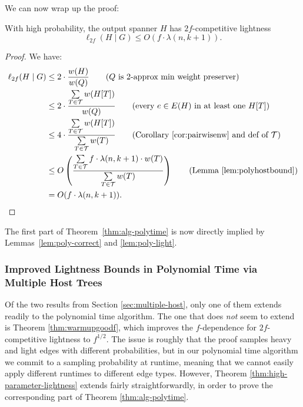 We can now wrap up the proof:
\begin{lemma} \label{lem:poly-light}
With high probability, the output spanner $H$ has $2f$-competitive lightness
$$\ell_{2f}(H \mid G) \le O\left( f \cdot \lambda(n, k+1) \right).$$
\end{lemma}
\begin{proof}
We have:
\begin{align*}
\ell_{2f}(H \mid G) &\le 2 \cdot \frac{w(H)}{w(Q)} \tag{$Q$ is $2$-approx min weight preserver}\\
&\leq 2 \cdot \frac{\sum \limits_{T \in \tee} w(H[T])}{w(Q)} \tag{every $e \in E(H)$ in at least one $H[T]$} \\ 
&\leq 4 \cdot \frac{\sum \limits_{T \in \tee} w(H[T])}{\sum \limits_{T \in \tee} w(T)} \tag{Corollary~\ref{cor:pairwisenw} and def of $\tee$}\\
&\le  O\left( \frac{\sum \limits_{T \in \tee} f \cdot \lambda(n, k+1) \cdot w(T)}{\sum \limits_{T \in \tee} w(T)} \right) \tag{Lemma \ref{lem:polyhostbound}}\\
&= O(f \cdot \lambda(n, k+1)). \tag*{\qedhere}
\end{align*}
\end{proof}

The first part of Theorem~\ref{thm:alg-polytime} is now directly implied by Lemmas~\ref{lem:poly-correct} and \ref{lem:poly-light}.

\subsubsection{Improved Lightness Bounds in Polynomial Time via Multiple Host Trees}

Of the two results from Section \ref{sec:multiple-host}, only one of them extends readily to the polynomial time algorithm.
The one that does \emph{not} seem to extend is Theorem \ref{thm:warmupgoodf}, which improves the $f$-dependence for $2f$-competitive lightness to $f^{1/2}$.
The issue is roughly that the proof samples heavy and light edges with different probabilities, but in our polynomial time algorithm we commit to a sampling probability at runtime, meaning that we cannot easily apply different runtimes to different edge types.
However, Theorem \ref{thm:high-parameter-lightness} extends fairly straightforwardly, in order to prove the corresponding part of Theorem \ref{thm:alg-polytime}.


